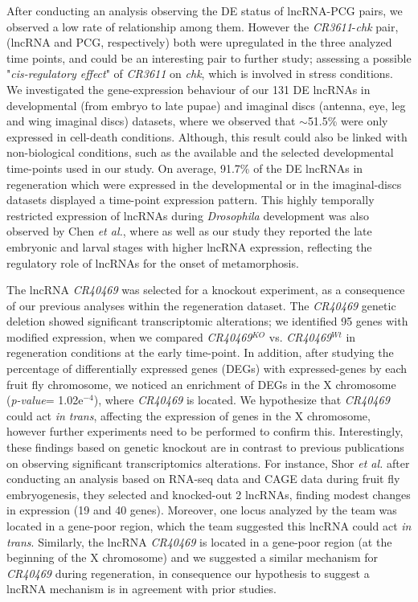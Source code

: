 After conducting an analysis observing the DE status of lncRNA-PCG pairs, we observed a low rate of relationship among them. However the \textit{CR3611}-\textit{chk} pair, (lncRNA and PCG, respectively) both were upregulated in the three analyzed time points, and could be an interesting pair to further study; assessing a possible "\textit{cis-regulatory effect}" of \textit{CR3611} on \textit{chk}, which is involved in stress conditions.\autocite{delgado_2018} We investigated the gene-expression behaviour of our 131 DE lncRNAs in developmental (from embryo to late pupae) and imaginal discs (antenna, eye, leg and wing imaginal discs) datasets, where we observed that $\sim$51.5\% were only expressed in cell-death conditions. Although, this result could also be linked with non-biological conditions, such as the available and the selected developmental time-points used in our study. On average, 91.7\% of the DE lncRNAs in regeneration which were expressed in the developmental or in the imaginal-discs datasets displayed a time-point expression pattern. This highly temporally restricted expression of lncRNAs during \textit{Drosophila} development was also observed by Chen \textit{et al.}, where as well as our study they reported the late embryonic and larval stages with higher lncRNA expression, reflecting the regulatory role of lncRNAs for the onset of metamorphosis.\autocite{chen_2016_lncRNA}

The lncRNA \textit{CR40469} was selected for a knockout experiment, as a consequence of our previous analyses within the regeneration dataset. The \textit{CR40469} genetic deletion showed significant transcriptomic alterations; we identified 95 genes with modified expression, when we compared \textit{CR40469}$^{KO}$ vs. \textit{CR40469}$^{Wt}$ in regeneration conditions at the early time-point. In addition, after studying the percentage of differentially expressed genes (DEGs) with expressed-genes by each fruit fly chromosome, we noticed an enrichment of DEGs in the X chromosome (\textit{p-value}= 1.02e$^{-4}$), where \textit{CR40469} is located. We hypothesize that \textit{CR40469} could act \textit{in trans}, affecting the expression of genes in the X chromosome, however further experiments need to be performed to confirm this. Interestingly, these findings based on genetic knockout are in contrast to previous publications on observing significant transcriptomics alterations. For instance, Shor \textit{et al.} after conducting an analysis based on RNA-seq data and CAGE data during fruit fly embryogenesis, they selected and knocked-out 2 lncRNAs, finding modest changes in expression (19 and 40 genes).\autocite{schor_2018} Moreover, one locus analyzed by the team was located in a gene-poor region, which the team suggested this lncRNA could act \textit{in trans}. Similarly, the lncRNA \textit{CR40469} is located in a gene-poor region (at the beginning of the X chromosome) and we suggested a similar mechanism for \textit{CR40469} during regeneration, in consequence our hypothesis to suggest a lncRNA mechanism is in agreement with prior studies.

